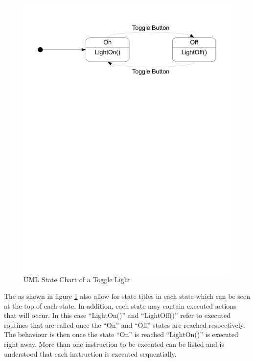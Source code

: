\begin{figure}[htp]
    \centering
    \includegraphics[trim= 15mm 200mm 15mm 10mm, clip, width=\imgmedium]{./images/state_uml_light.pdf} 
    \caption{UML State Chart of a Toggle Light}
    \label{fig:state_uml_light}
\end{figure}


The \cite{UML2} as shown in figure \ref{fig:state_uml_light} also allow for state titles in each state which can be seen at the top of each state. In addition, each state may contain executed actions that will occur. In this case ``LightOn()'' and ``LightOff()'' refer to executed routines that are called once the ``On'' and ``Off'' states are reached respectively. The behaviour is then once the state ``On'' is reached ``LightOn()'' is executed right away. More than one instruction to be executed can be listed and is understood that each instruction is executed sequentially\cite{UML2}.

